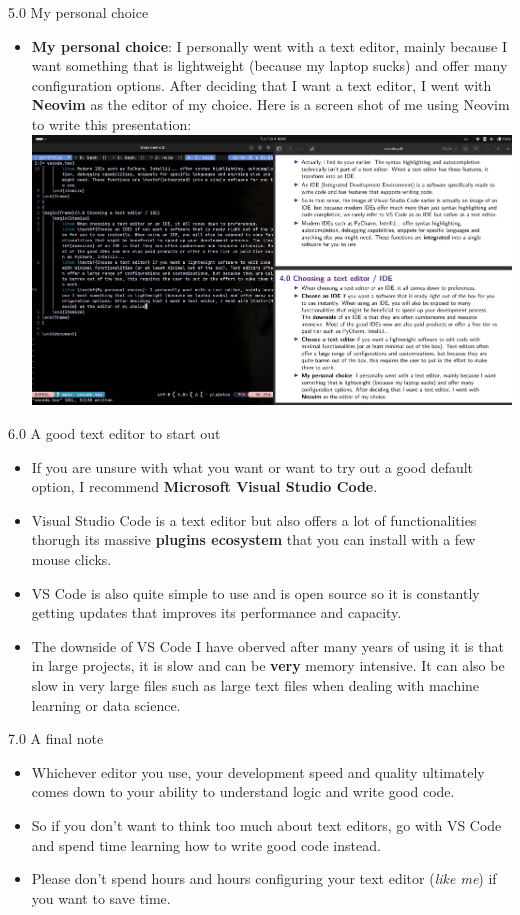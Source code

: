 \documentclass [aspectratio=169]{beamer}
\begin{document}
{
\begin{frame}{5.0 My personal choice}
    \begin{itemize}
        \item \textbf{My personal choice}: I personally went with a text editor, mainly because I want something that is lightweight (because my laptop sucks) and offer many configuration options. After deciding that I want a text editor, I went with \textbf{Neovim} as the editor of my choice. Here is a screen shot of me using Neovim to write this presentation:
            {
                \centering
                \includegraphics[width=0.5\linewidth]{figures/neovim.png}
            }
    \end{itemize}
\end{frame}
}
{
\begin{frame}{6.0 A good text editor to start out}
    \begin{itemize}
        \item If you are unsure with what you want or want to try out a good default option, I recommend \textbf{Microsoft Visual Studio Code}.
        \item Visual Studio Code is a text editor but also offers a lot of functionalities thorugh its massive \textbf{plugins ecosystem} that you can install with a few mouse clicks.
        \item VS Code is also quite simple to use and is open source so it is constantly getting updates that improves its performance and capacity. 
        \item The downside of VS Code I have oberved after many years of using it is that in large projects, it is slow and can be \textbf{very} memory intensive. It can also be slow in very large files such as large text files when dealing with machine learning or data science.
    \end{itemize}
\end{frame}
}
{
\begin{frame}{7.0 A final note}
    \begin{itemize}
        \item Whichever editor you use, your development speed and quality ultimately comes down to your ability to understand logic and write good code.
        \item So if you don't want to think too much about text editors, go with VS Code and spend time learning how to write good code instead. 
        \item Please don't spend hours and hours configuring your text editor (\textit{like me}) if you want to save time.
    \end{itemize}
\end{frame}
}
\end{document}
